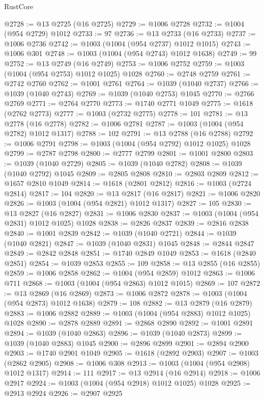 \begin{lexlean}{RustCore}
\begin{coremodule}
@2728 := @13 @2725 (@16 @2725)
@2729 := @1006 @2728
@2732 := @1004 (@954 @2729) @1012
@2733 := 97
@2736 := @13 @2733 (@16 @2733)
@2737 := @1006 @2736
@2742 := @1003 (@1004 (@954 @2737) @1012 @1015)
@2743 := @1006 @301
@2748 := @1003 (@1004 (@954 @2743) @1012 @1638)
@2749 := 99
@2752 := @13 @2749 (@16 @2749)
@2753 := @1006 @2752
@2759 := @1003 (@1004 (@954 @2753) @1012 @1025) @1028
@2760 := @2748 @2759
@2761 := @2742 @2760
@2762 := @1001 @2761
@2764 := @1039 (@1040 @2737)
@2766 := @1039 (@1040 @2743)
@2769 := @1039 (@1040 @2753) @1045
@2770 := @2766 @2769
@2771 := @2764 @2770
@2773 := @1740 @2771 @1049
@2775 := @1618 (@2762 @2773)
@2777 := @1003 (@2732 @2775)
@2778 := 101
@2781 := @13 @2778 (@16 @2778)
@2782 := @1006 @2781
@2787 := @1003 (@1004 (@954 @2782) @1012 @1317)
@2788 := 102
@2791 := @13 @2788 (@16 @2788)
@2792 := @1006 @2791
@2798 := @1003 (@1004 (@954 @2792) @1012 @1025) @1028
@2799 := @2787 @2798
@2800 := @2777 @2799
@2801 := @1001 @2800
@2803 := @1039 (@1040 @2729)
@2805 := @1039 (@1040 @2782)
@2808 := @1039 (@1040 @2792) @1045
@2809 := @2805 @2808
@2810 := @2803 @2809
@2812 := @1657 @2810 @1049
@2814 := @1618 (@2801 @2812)
@2816 := @1003 (@2724 @2814)
@2817 := 104
@2820 := @13 @2817 (@16 @2817)
@2821 := @1006 @2820
@2826 := @1003 (@1004 (@954 @2821) @1012 @1317)
@2827 := 105
@2830 := @13 @2827 (@16 @2827)
@2831 := @1006 @2830
@2837 := @1003 (@1004 (@954 @2831) @1012 @1025) @1028
@2838 := @2826 @2837
@2839 := @2816 @2838
@2840 := @1001 @2839
@2842 := @1039 (@1040 @2721)
@2844 := @1039 (@1040 @2821)
@2847 := @1039 (@1040 @2831) @1045
@2848 := @2844 @2847
@2849 := @2842 @2848
@2851 := @1740 @2849 @1049
@2853 := @1618 (@2840 @2851)
@2854 := @1039 @2853
@2855 := 109
@2858 := @13 @2855 (@16 @2855)
@2859 := @1006 @2858
@2862 := @1004 (@954 @2859) @1012
@2863 := @1006 @711
@2868 := @1003 (@1004 (@954 @2863) @1012 @1015)
@2869 := 107
@2872 := @13 @2869 (@16 @2869)
@2873 := @1006 @2872
@2878 := @1003 (@1004 (@954 @2873) @1012 @1638)
@2879 := 108
@2882 := @13 @2879 (@16 @2879)
@2883 := @1006 @2882
@2889 := @1003 (@1004 (@954 @2883) @1012 @1025) @1028
@2890 := @2878 @2889
@2891 := @2868 @2890
@2892 := @1001 @2891
@2894 := @1039 (@1040 @2863)
@2896 := @1039 (@1040 @2873)
@2899 := @1039 (@1040 @2883) @1045
@2900 := @2896 @2899
@2901 := @2894 @2900
@2903 := @1740 @2901 @1049
@2905 := @1618 (@2892 @2903)
@2907 := @1003 (@2862 @2905)
@2908 := @1006 @308
@2913 := @1003 (@1004 (@954 @2908) @1012 @1317)
@2914 := 111
@2917 := @13 @2914 (@16 @2914)
@2918 := @1006 @2917
@2924 := @1003 (@1004 (@954 @2918) @1012 @1025) @1028
@2925 := @2913 @2924
@2926 := @2907 @2925

\end{coremodule}
\end{lexlean}
